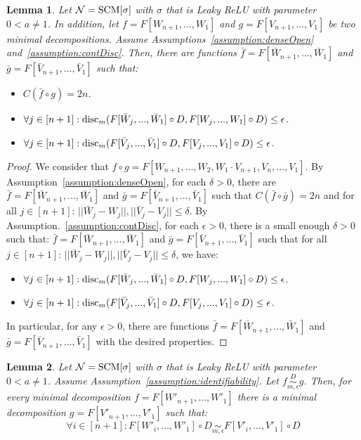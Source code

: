 \documentclass{article} %
\newtheorem{lem}{Lemma}
\newcommand{\disc}{\textnormal{disc}}
\begin{document}
 

\begin{lem}\label{lem:approxFunc} Let $\mathcal{N} = \textnormal{SCM}[\sigma]$ with $\sigma$ that is Leaky ReLU with parameter $0<a\neq 1$. In addition, let $f = F[W_{n+1},...,W_1]$ and $g = F[V_{n+1},...,V_1]$ be two minimal decompositions. Assume Assumptions~\ref{assumption:denseOpen} and~\ref{assumption:contDisc}. Then, there are functions $\bar{f} = F[\bar{W}_{n+1},...,\bar{W}_1]$ and $\bar{g} = F[\bar{V}_{n+1},...,\bar{V}_1]$ such that: 
\begin{itemize}
\item $C(\bar{f} \circ g) = 2n$.
\item $\forall j \in [n+1]: \disc_m(F[\bar{W}_j,...,\bar{W}_1] \circ D,F[W_j,...,W_1] \circ D) \leq \epsilon$.
\item $\forall j \in [n+1]: \disc_m(F[\bar{V}_j,...,\bar{V}_1] \circ D,F[V_j,...,V_1] \circ D) \leq \epsilon$.
\end{itemize}

\end{lem}


\begin{proof} We consider that $f \circ g = F[W_{n+1},...,W_2,W_1 \cdot V_{n+1},V_n,...,V_1]$. By Assumption~\ref{assumption:denseOpen}, for each $\delta>0$, there are $\bar{f} = F[\bar{W}_{n+1},...,\bar{W}_1]$ and $\bar{g} = F[\bar{V}_{n+1},...,\bar{V}_1]$ such that $C(\bar{f} \circ \bar{g}) = 2n$ and for all $j \in [n+1]$: $||\bar{W}_j - W_j||, ||\bar{V}_j - V_j|| \leq \delta$. By Assumption.~\ref{assumption:contDisc}, for each $\epsilon>0$, there is a small enough $\delta>0$ such that: $\bar{f} = F[\bar{W}_{n+1},...,\bar{W}_1]$ and $\bar{g} = F[\bar{V}_{n+1},...,\bar{V}_1]$ such that for all $j \in [n+1]$: $||\bar{W}_j - W_j||, ||\bar{V}_j - V_j|| \leq \delta$, we have:
\begin{itemize}
\item $\forall j \in [n+1]: \disc_m(F[\bar{W}_j,...,\bar{W}_1] \circ D,F[W_j,...,W_1] \circ D) \leq \epsilon$.
\item $\forall j \in [n+1]: \disc_m(F[\bar{V}_j,...,\bar{V}_1] \circ D,F[V_j,...,V_1] \circ D) \leq \epsilon$.
\end{itemize}
In particular, for any $\epsilon>0$, there are functions $\bar{f} = F[\bar{W}_{n+1},...,\bar{W}_1]$ and $\bar{g} = F[\bar{V}_{n+1},...,\bar{V}_1]$  with the desired properties.
\end{proof}

\begin{lem}\label{lem:extCloseFunc} Let $\mathcal{N} = \textnormal{SCM}[\sigma]$ with $\sigma$ that is Leaky ReLU with parameter $0<a\neq 1$. Assume Assumption~\ref{assumption:identifiability}. Let $f \overset{D}{\underset{m,\epsilon}{\sim}} g$. Then, for every minimal decomposition $f = F[W'_{n+1},...,W'_1]$ there is a minimal decomposition $g = F[V'_{n+1},...,V'_1]$ such that:
\begin{equation}
\forall i \in [n+1]: F[W'_i,...,W'_1] \circ D \underset{m,\epsilon}{\sim} F[V'_i,...,V'_1] \circ D
\end{equation}
\end{lem}
\end{document}
